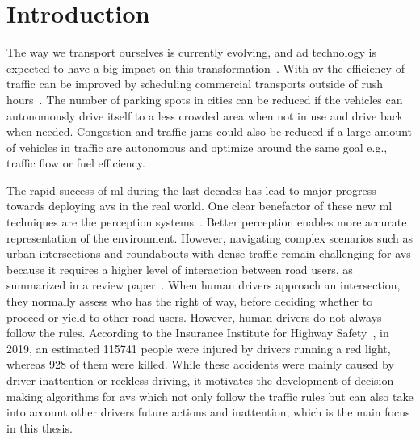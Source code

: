\chapter{Introduction} \label{ch:intro}
The way we transport ourselves is currently evolving, and \gls{ad} technology is expected to have a big impact on this transformation~\cite{traffic21, McKinsey2023}. With \gls{av} the efficiency of traffic can be improved by scheduling commercial transports outside of rush hours~\cite{FAGNANT2015167}. The number of parking spots in cities can be reduced if the vehicles can autonomously drive itself to a less crowded area when not in use and drive back when needed. Congestion and traffic jams could also be reduced if a large amount of vehicles in traffic are autonomous and optimize around the same goal e.g., traffic flow or fuel efficiency. 

The rapid success of \gls{ml} during the last decades has lead to major progress towards deploying \gls{av}s in the real world. One clear benefactor of these new \gls{ml} techniques are the perception systems~\cite{Janai2020}. Better perception enables more accurate representation of the environment. 
However, navigating complex scenarios such as urban intersections and roundabouts with dense traffic remain challenging for \gls{av}s because it requires a higher level of interaction between road users, as summarized in a review paper~\cite{Schwarting2018}. 
When human drivers approach an intersection, they normally assess who has the right of way, before deciding whether to proceed or yield to other road users. However, human drivers do not always follow the rules.
According to the Insurance Institute for Highway Safety~\cite{IIHS2019}, in 2019, an estimated \num{115741} people were injured by drivers running a red light, whereas \num{928} of them were killed. 
While these accidents were mainly caused by driver inattention or reckless driving, it motivates the development of decision-making algorithms for \gls{av}s which not only follow the traffic rules but can also take into account other drivers future actions and inattention, which is the main focus in this thesis. 

